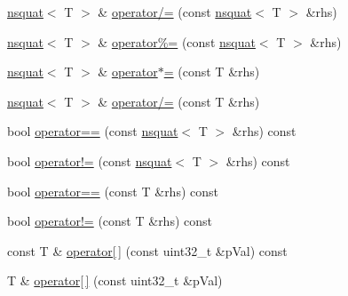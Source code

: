 \begin{DoxyCompactItemize}
\item 
\hyperlink{structnsquat}{nsquat}$<$ T $>$ \& \hyperlink{structnsquat_ac4e347acd4b804ce3369467f1ee91281}{operator/=} (const \hyperlink{structnsquat}{nsquat}$<$ T $>$ \&rhs)
\item 
\hyperlink{structnsquat}{nsquat}$<$ T $>$ \& \hyperlink{structnsquat_a53432d27f6c26d343dcfc6f469d4b09f}{operator\%=} (const \hyperlink{structnsquat}{nsquat}$<$ T $>$ \&rhs)
\item 
\hyperlink{structnsquat}{nsquat}$<$ T $>$ \& \hyperlink{structnsquat_a0e36ccaab5069ad5a1d5cd4b3092bf4e}{operator$\ast$=} (const T \&rhs)
\item 
\hyperlink{structnsquat}{nsquat}$<$ T $>$ \& \hyperlink{structnsquat_a8b17da74bf34e207af7a4c1e48698947}{operator/=} (const T \&rhs)
\item 
bool \hyperlink{structnsquat_ab868746accfba6a44b7e2dbad8b974ab}{operator==} (const \hyperlink{structnsquat}{nsquat}$<$ T $>$ \&rhs) const 
\item 
bool \hyperlink{structnsquat_af025972f48140ebbfbb9a39326317243}{operator!=} (const \hyperlink{structnsquat}{nsquat}$<$ T $>$ \&rhs) const 
\item 
bool \hyperlink{structnsquat_ad46b5d79ec488a5eb69ca38cc516e88e}{operator==} (const T \&rhs) const 
\item 
bool \hyperlink{structnsquat_a3033a3f339f296580eb4e43e7a61b6ae}{operator!=} (const T \&rhs) const 
\item 
const T \& \hyperlink{structnsquat_a0a083bc295c753469d93d0d64d366498}{operator\mbox{[}$\,$\mbox{]}} (const uint32\-\_\-t \&p\-Val) const 
\item 
T \& \hyperlink{structnsquat_ad06fdf71da90af526b2411fdd7cfbc2a}{operator\mbox{[}$\,$\mbox{]}} (const uint32\-\_\-t \&p\-Val)
\end{DoxyCompactItemize}

